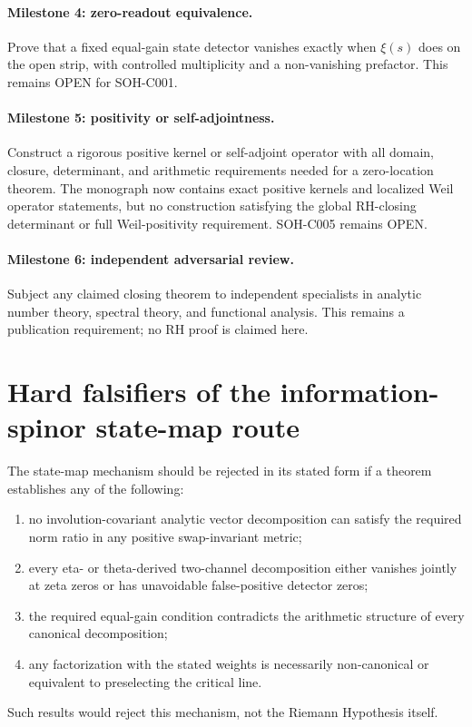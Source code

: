 \paragraph{Milestone 4: zero-readout equivalence.}
Prove that a fixed equal-gain state detector vanishes exactly when $\xi(s)$ does on the open strip, with controlled multiplicity and a non-vanishing prefactor. This remains OPEN for SOH-C001.

\paragraph{Milestone 5: positivity or self-adjointness.}
Construct a rigorous positive kernel or self-adjoint operator with all domain, closure, determinant, and arithmetic requirements needed for a zero-location theorem. The monograph now contains exact positive kernels and localized Weil operator statements, but no construction satisfying the global RH-closing determinant or full Weil-positivity requirement. SOH-C005 remains OPEN.

\paragraph{Milestone 6: independent adversarial review.}
Subject any claimed closing theorem to independent specialists in analytic number theory, spectral theory, and functional analysis. This remains a publication requirement; no RH proof is claimed here.

\section{Hard falsifiers of the information-spinor state-map route}

The state-map mechanism should be rejected in its stated form if a theorem establishes any of the following:
\begin{enumerate}
  \item no involution-covariant analytic vector decomposition can satisfy the required norm ratio in any positive swap-invariant metric;
  \item every eta- or theta-derived two-channel decomposition either vanishes jointly at zeta zeros or has unavoidable false-positive detector zeros;
  \item the required equal-gain condition contradicts the arithmetic structure of every canonical decomposition;
  \item any factorization with the stated weights is necessarily non-canonical or equivalent to preselecting the critical line.
\end{enumerate}
Such results would reject this mechanism, not the Riemann Hypothesis itself.

